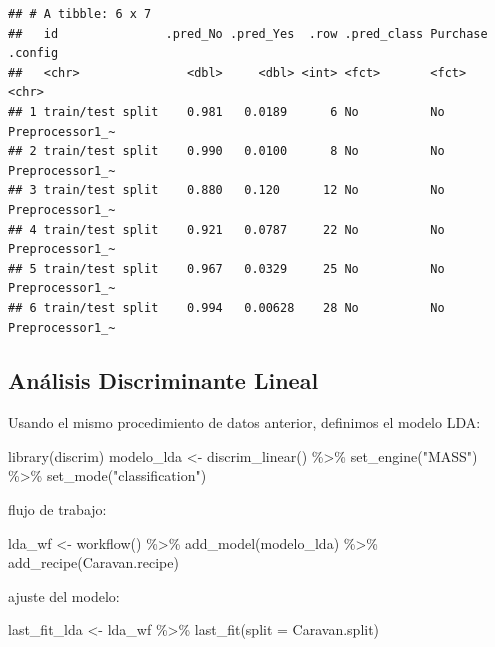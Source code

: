 \documentclass[
  12pt,
]{book}
\newenvironment{Shaded}{\begin{snugshade}}{\end{snugshade}}
\newcommand{\AttributeTok}[1]{\textcolor[rgb]{0.77,0.63,0.00}{#1}}
\newcommand{\FunctionTok}[1]{\textcolor[rgb]{0.00,0.00,0.00}{#1}}
\newcommand{\NormalTok}[1]{#1}
\newcommand{\OtherTok}[1]{\textcolor[rgb]{0.56,0.35,0.01}{#1}}
\newcommand{\SpecialCharTok}[1]{\textcolor[rgb]{0.00,0.00,0.00}{#1}}
\newcommand{\StringTok}[1]{\textcolor[rgb]{0.31,0.60,0.02}{#1}}
\begin{document}
\begin{verbatim}
## # A tibble: 6 x 7
##   id               .pred_No .pred_Yes  .row .pred_class Purchase .config        
##   <chr>               <dbl>     <dbl> <int> <fct>       <fct>    <chr>          
## 1 train/test split    0.981   0.0189      6 No          No       Preprocessor1_~
## 2 train/test split    0.990   0.0100      8 No          No       Preprocessor1_~
## 3 train/test split    0.880   0.120      12 No          No       Preprocessor1_~
## 4 train/test split    0.921   0.0787     22 No          No       Preprocessor1_~
## 5 train/test split    0.967   0.0329     25 No          No       Preprocessor1_~
## 6 train/test split    0.994   0.00628    28 No          No       Preprocessor1_~
\end{verbatim}

\hypertarget{anuxe1lisis-discriminante-lineal-1}{%
\subsection{Análisis Discriminante
Lineal}\label{anuxe1lisis-discriminante-lineal-1}}

Usando el mismo procedimiento de datos anterior, definimos el modelo
LDA:

\begin{Shaded}
\begin{Highlighting}[]
\FunctionTok{library}\NormalTok{(discrim)}
\NormalTok{modelo\_lda }\OtherTok{\textless{}{-}} \FunctionTok{discrim\_linear}\NormalTok{() }\SpecialCharTok{\%\textgreater{}\%}
    \FunctionTok{set\_engine}\NormalTok{(}\StringTok{"MASS"}\NormalTok{) }\SpecialCharTok{\%\textgreater{}\%}
    \FunctionTok{set\_mode}\NormalTok{(}\StringTok{"classification"}\NormalTok{)}
\end{Highlighting}
\end{Shaded}

flujo de trabajo:

\begin{Shaded}
\begin{Highlighting}[]
\NormalTok{lda\_wf }\OtherTok{\textless{}{-}} \FunctionTok{workflow}\NormalTok{() }\SpecialCharTok{\%\textgreater{}\%}
    \FunctionTok{add\_model}\NormalTok{(modelo\_lda) }\SpecialCharTok{\%\textgreater{}\%}
    \FunctionTok{add\_recipe}\NormalTok{(Caravan.recipe)}
\end{Highlighting}
\end{Shaded}

ajuste del modelo:

\begin{Shaded}
\begin{Highlighting}[]
\NormalTok{last\_fit\_lda }\OtherTok{\textless{}{-}}\NormalTok{ lda\_wf }\SpecialCharTok{\%\textgreater{}\%}
    \FunctionTok{last\_fit}\NormalTok{(}\AttributeTok{split =}\NormalTok{ Caravan.split)}
\end{Highlighting}
\end{Shaded}
\end{document}
